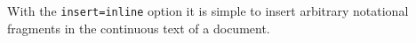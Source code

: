 \documentclass{scrartcl}
\begin{document}
With the \texttt{insert=inline} option it is simple to insert arbitrary
notational fragments in the
continuous text of a document.
\end{document}
